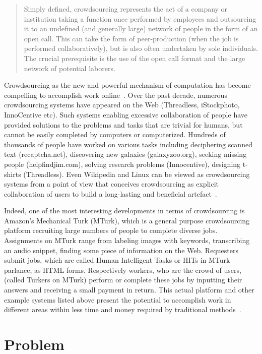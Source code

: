 \begin{quotation}
Simply defined, crowdsourcing represents the act of a company or institution taking 
a function once performed by employees and outsourcing it to an undefined 
(and generally large) network of people in the form of an open call. This can take 
the form of peer-production (when the job is performed collaboratively), but is also 
often undertaken by sole individuals. The crucial prerequisite is the use of the open 
call format and the large network of potential laborers.~\cite{Howe2006a}
\end{quotation}

Crowdsourcing as the new and powerful mechanism of computation has become 
compelling to accomplish work online~\cite{Kittur2011}. Over the past decade, numerous 
crowdsourcing systems have appeared on the Web (Threadless, iStockphoto, 
InnoCentive etc). Such systems enabling excessive collaboration of people have 
provided solutions to the problems and tasks that are trivial for humans, but 
cannot be easily completed by computers or computerized. Hundreds of thousands 
of people have worked on various tasks including deciphering scanned text (recaptcha.net), 
discovering new galaxies (galaxyzoo.org), seeking missing people (helpfindjim.com), 
solving research problems (Innocentive), designing t-shirts (Threadless). Even 
Wikipedia and Linux can be viewed as crowdsourcing systems from a point of view that
conceives crowdsourcing as explicit collaboration of users to 
build a long-lasting and beneficial artefact~\cite{Doan2011}.

Indeed, one of the most interesting developments in terms of crowdsourcing is 
Amazon's Mechanical Turk (MTurk), which is a general purpose crowdsourcing platform 
recruiting large numbers of people to complete diverse jobs. Assignments on MTurk 
range from labeling images with keywords, transcribing an audio snippet, finding some 
piece of information on the Web. Requesters submit jobs, which are called Human 
Intelligent Tasks or HITs in MTurk parlance, as HTML forms. Respectively workers, 
who are the crowd of users, (called Turkers on MTurk) perform or complete these 
jobs by inputting their answers and receiving a small payment in return. This actual 
platform and other example systems listed above present the potential to accomplish 
work in different areas within less time and money required by traditional 
methods~\cite{Minder2012, Marcus2011}.


\section{Problem}
\label{sec:problem}

